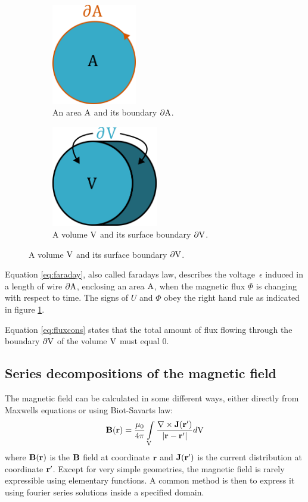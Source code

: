 \begin{figure}
    \centering
    \begin{subfigure}[b]{0.4\textwidth}
        \centering
        \includegraphics[height=125pt]{figs/partialA}
        \caption{An area $\mathrm{A}$ and its boundary $\partial \mathrm{A}$. }
        \label{fig:partialA}
    \end{subfigure}
    \hfill
    \begin{subfigure}[b]{0.4\textwidth}
        \centering
        \includegraphics[height=125pt]{figs/partialV}
        \caption{A volume $\mathrm{V}$ and its surface boundary $\partial \mathrm{V}$.}
        \label{fig:partialV}
    \end{subfigure}
\end{figure}
Equation \ref{eq:faraday}, also called faradays law, describes the voltage\
$\epsilon$ induced in a length of wire $\partial\mathrm{A}$, enclosing an area
$\mathrm{A}$, when the magnetic flux $\Phi$ is changing with respect to time.
The signs of $U$ and $\Phi$ obey the right hand rule as indicated
in figure \ref{fig:partialA}.

Equation \ref{eq:fluxcons} states that the total amount of flux flowing
through the boundary $\partial\mathrm{V}$ of the volume
$\mathrm{V}$ must equal 0. \cite[Ch.4.1.1]{russenschuck2011field}

\subsection{Series decompositions of the magnetic field}
The magnetic field can be calculated in some different ways, either
directly from Maxwells equations or using Biot-Savarts law:
\begin{equation}
    \vb{B}(\vb{r}) = \frac{\mu_0}{4\pi}\int\limits_{\mathrm{V}}
    \frac{\nabla \times \vb{J}(\vb{r'})}{|\vb{r} - \vb{r'}|} d\mathrm{V}
\end{equation}
where $\vb{B}(\vb{r})$ is the $\vb{B}$ field at coordinate $\vb{r}$ and
$\vb{J}(\vb{r'})$ is the current distribution at coordinate $\vb{r'}$.
\cite[Ch.5.4]{russenschuck2011field}
Except for very simple geometries, the magnetic field is rarely
expressible using elementary functions. A common method is then
to express it using fourier series solutions inside a specified domain.
\cite[Ch.6]{russenschuck2011field}

